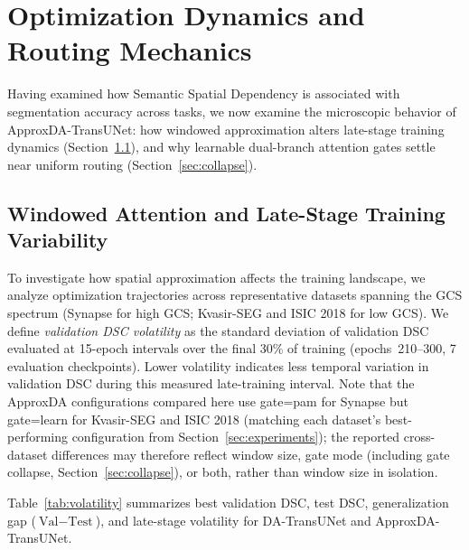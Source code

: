 \section{Optimization Dynamics and Routing Mechanics}
\label{sec:optimization_routing}
\label{sec:generalization}

Having examined how Semantic Spatial Dependency is associated with segmentation accuracy across tasks, we now examine the microscopic behavior of ApproxDA-TransUNet: how windowed approximation alters late-stage training dynamics (Section~\ref{sec:volatility}), and why learnable dual-branch attention gates settle near uniform routing (Section~\ref{sec:collapse}).

\subsection{Windowed Attention and Late-Stage Training Variability}
\label{sec:volatility}

To investigate how spatial approximation affects the training landscape, we analyze optimization trajectories across representative datasets spanning the GCS spectrum (Synapse for high GCS; Kvasir-SEG and ISIC 2018 for low GCS). We define \emph{validation DSC volatility} as the standard deviation of validation DSC evaluated at 15-epoch intervals over the final 30\% of training (epochs~210--300, 7 evaluation checkpoints). Lower volatility indicates less temporal variation in validation DSC during this measured late-training interval. Note that the ApproxDA configurations compared here use gate=pam for Synapse but gate=learn for Kvasir-SEG and ISIC 2018 (matching each dataset's best-performing configuration from Section~\ref{sec:experiments}); the reported cross-dataset differences may therefore reflect window size, gate mode (including gate collapse, Section~\ref{sec:collapse}), or both, rather than window size in isolation.

Table~\ref{tab:volatility} summarizes best validation DSC, test DSC, generalization gap ($\text{Val} - \text{Test}$), and late-stage volatility for DA-TransUNet and ApproxDA-TransUNet.

